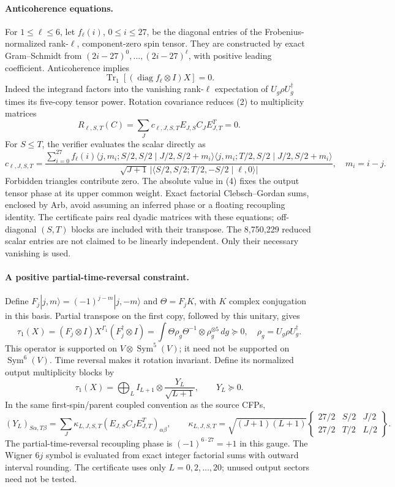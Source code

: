 \documentclass[11pt]{article}
\newcommand{\Tr}{\operatorname{Tr}}
\newcommand{\Sym}{\operatorname{Sym}}
\begin{document}
\paragraph{Anticoherence equations.}
For $1\le\ell\le6$, let $f_\ell(i)$, $0\le i\le27$, be the diagonal
entries of the Frobenius-normalized rank-$\ell$, component-zero spin
tensor. They are constructed by exact Gram--Schmidt from
$(2i-27)^0,\ldots,(2i-27)^\ell$, with positive leading coefficient.
Anticoherence implies
\[
 \Tr_1[(\operatorname{diag}f_\ell\otimes I)X]=0.       \tag{2}
\]
Indeed the integrand factors into the vanishing rank-$\ell$ expectation
of $U_g\rho U_g^\dagger$ times its five-copy tensor power.
Rotation covariance reduces (2) to multiplicity matrices
\[
 R_{\ell,S,T}(C)
 =\sum_J c_{\ell,J,S,T}E_{J,S}C_JE_{J,T}^{T}=0.       \tag{3}
\]
For $S\le T$, the verifier evaluates the scalar directly as
\[
 c_{\ell,J,S,T}=
 \frac{\displaystyle\sum_{i=0}^{27}f_\ell(i)
 \langle j,m_i;S/2,S/2\mid J/2,S/2+m_i\rangle
 \langle j,m_i;T/2,S/2\mid J/2,S/2+m_i\rangle}
 {\sqrt{J+1}\,
  |\langle S/2,S/2;T/2,-S/2\mid\ell,0\rangle|},
 \quad m_i=i-j.                                     \tag{4}
\]
Forbidden triangles contribute zero. The absolute value in (4) fixes the
output tensor phase at its upper common weight. Exact factorial
Clebsch--Gordan sums, enclosed by Arb, avoid assuming an inferred phase
or a floating recoupling identity. The certificate pairs real dyadic
matrices with these equations; off-diagonal $(S,T)$ blocks are included
with their transpose. The 8,750,229 reduced scalar entries are not
claimed to be linearly independent. Only their necessary vanishing is
used.

\paragraph{A positive partial-time-reversal constraint.}
Define $F_j|j,m\rangle=(-1)^{j-m}|j,-m\rangle$ and
$\Theta=F_jK$, with $K$ complex conjugation in this basis. Partial
transpose on the first copy, followed by this unitary, gives
\[
 \tau_1(X)=(F_j\otimes I)X^{\Gamma_1}(F_j^\dagger\otimes I)
 =\int\Theta\rho_g\Theta^{-1}\otimes\rho_g^{\otimes5}\,dg\succeq0,
 \quad\rho_g=U_g\rho U_g^\dagger.                    \tag{5}
\]
This operator is supported on $V\otimes\Sym^5(V)$; it need not be
supported on $\Sym^6(V)$. Time reversal makes it rotation invariant.
Define its normalized output multiplicity blocks by
\[
 \tau_1(X)=\bigoplus_L I_{L+1}\otimes
                  \frac{Y_L}{\sqrt{L+1}},\qquad Y_L\succeq0.
\]
In the same first-spin/parent coupled convention as the source CFPs,
\[
 (Y_L)_{S\alpha,T\beta}
 =\sum_J\kappa_{L,J,S,T}
       (E_{J,S}C_JE_{J,T}^{T})_{\alpha\beta},\qquad
 \kappa_{L,J,S,T}
 =\sqrt{(J+1)(L+1)}
 \begin{Bmatrix}27/2&S/2&J/2\\27/2&T/2&L/2\end{Bmatrix}.           \tag{6}
\]
The partial-time-reversal recoupling phase is
$(-1)^{6\cdot27}=+1$ in this gauge. The Wigner $6j$ symbol is evaluated
from exact integer factorial sums with outward interval rounding.
The certificate uses only $L=0,2,\ldots,20$; unused output sectors need
not be tested.
\end{document}
